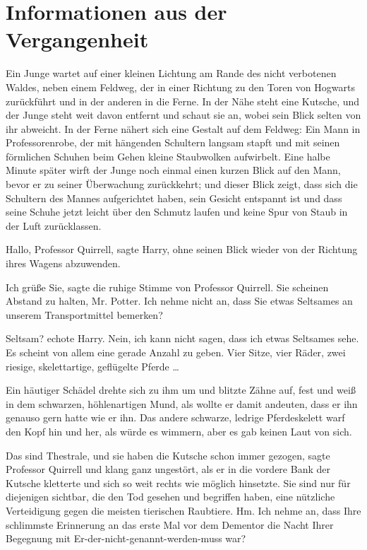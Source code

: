 \chapter{Informationen aus der Vergangenheit}

Ein Junge wartet auf einer kleinen Lichtung am Rande des nicht verbotenen
Waldes, neben einem Feldweg, der in einer Richtung zu den Toren von Hogwarts
zurückführt und in der anderen in die Ferne. In der Nähe steht eine Kutsche, und
der Junge steht weit davon entfernt und schaut sie an, wobei sein Blick selten
von ihr abweicht. In der Ferne nähert sich eine Gestalt auf dem Feldweg: Ein
Mann in Professorenrobe, der mit hängenden Schultern langsam stapft und mit
seinen förmlichen Schuhen beim Gehen kleine Staubwolken aufwirbelt. Eine halbe
Minute später wirft der Junge noch einmal einen kurzen Blick auf den Mann, bevor
er zu seiner Überwachung zurückkehrt; und dieser Blick zeigt, dass sich die
Schultern des Mannes aufgerichtet haben, sein Gesicht entspannt ist und dass
seine Schuhe jetzt leicht über den Schmutz laufen und keine Spur von Staub in
der Luft zurücklassen.

\glqq{}Hallo, Professor Quirrell\grqq{}, sagte Harry, ohne seinen Blick wieder
von der Richtung ihres Wagens abzuwenden.

\glqq{}Ich grüße Sie\grqq{}, sagte die ruhige Stimme von Professor Quirrell.
\glqq{}Sie scheinen Abstand zu halten, Mr. Potter. Ich nehme nicht an, dass Sie
etwas Seltsames an unserem Transportmittel bemerken?\grqq{}

\glqq{}Seltsam?\grqq{} echote Harry. \glqq{}Nein, ich kann nicht sagen, dass ich
etwas Seltsames sehe. Es scheint von allem eine gerade Anzahl zu geben. Vier
Sitze, vier Räder, zwei riesige, skelettartige, geflügelte Pferde …\grqq{}

Ein häutiger Schädel drehte sich zu ihm um und blitzte Zähne auf, fest und weiß
in dem schwarzen, höhlenartigen Mund, als wollte er damit andeuten, dass er ihn
genauso gern hatte wie er ihn. Das andere schwarze, ledrige Pferdeskelett warf
den Kopf hin und her, als würde es wimmern, aber es gab keinen Laut von sich.

\glqq{}Das sind Thestrale, und sie haben die Kutsche schon immer gezogen\grqq{},
sagte Professor Quirrell und klang ganz ungestört, als er in die vordere Bank
der Kutsche kletterte und sich so weit rechts wie möglich hinsetzte. \glqq{}Sie
sind nur für diejenigen sichtbar, die den Tod gesehen und begriffen haben, eine
nützliche Verteidigung gegen die meisten tierischen Raubtiere. Hm. Ich nehme an,
dass Ihre schlimmste Erinnerung an das erste Mal vor dem Dementor die Nacht
Ihrer Begegnung mit Er-der-nicht-genannt-werden-muss war?\grqq{}

